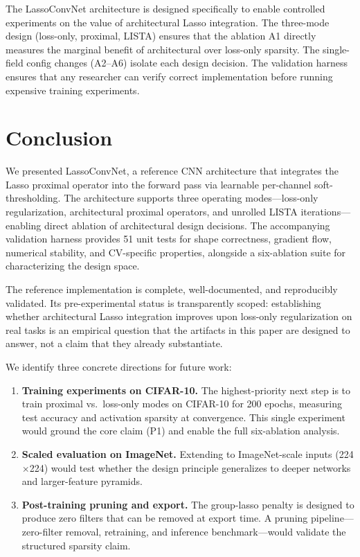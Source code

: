 \documentclass{article}
\begin{document}
The LassoConvNet architecture is designed specifically to enable controlled
experiments on the value of architectural Lasso integration. The three-mode
design (loss-only, proximal, LISTA) ensures that the ablation A1 directly
measures the marginal benefit of architectural over loss-only sparsity. The
single-field config changes (A2--A6) isolate each design decision. The
validation harness ensures that any researcher can verify correct
implementation before running expensive training experiments.

\section{Conclusion}
\label{sec:conclusion}

We presented LassoConvNet, a reference CNN architecture that integrates the
Lasso proximal operator into the forward pass via learnable per-channel
soft-thresholding. The architecture supports three operating modes---loss-only
regularization, architectural proximal operators, and unrolled LISTA
iterations---enabling direct ablation of architectural design decisions. The
accompanying validation harness provides 51 unit tests for shape correctness,
gradient flow, numerical stability, and CV-specific properties, alongside a
six-ablation suite for characterizing the design space.

The reference implementation is complete, well-documented, and reproducibly
validated. Its pre-experimental status is transparently scoped: establishing
whether architectural Lasso integration improves upon loss-only regularization
on real tasks is an empirical question that the artifacts in this paper are
designed to answer, not a claim that they already substantiate.

We identify three concrete directions for future work:

\begin{enumerate}
    \item \textbf{Training experiments on CIFAR-10.} The highest-priority
          next step is to train proximal vs.\ loss-only modes on CIFAR-10
          for 200 epochs, measuring test accuracy and activation sparsity at
          convergence. This single experiment would ground the core claim
          (P1) and enable the full six-ablation analysis.
    \item \textbf{Scaled evaluation on ImageNet.} Extending to ImageNet-scale
          inputs (224$\times$224) would test whether the design principle
          generalizes to deeper networks and larger-feature pyramids.
    \item \textbf{Post-training pruning and export.} The group-lasso penalty
          is designed to produce zero filters that can be removed at export
          time. A pruning pipeline---zero-filter removal, retraining, and
          inference benchmark---would validate the structured sparsity claim.
\end{enumerate}
\end{document}
